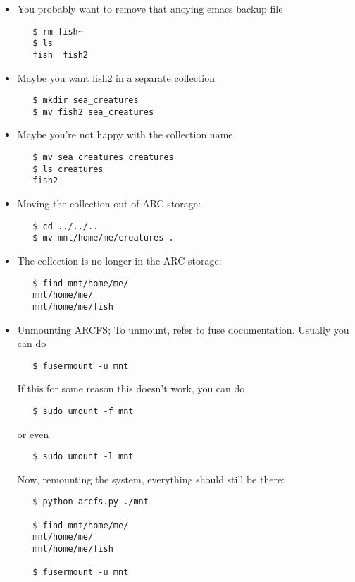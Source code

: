 \documentclass{book}
\begin{document}
\begin{itemize}
\item You probably want to remove that anoying emacs backup file
\begin{verbatim}   
   $ rm fish~
   $ ls 
   fish  fish2
\end{verbatim}

\item Maybe you want fish2 in a separate collection
\begin{verbatim}   
   $ mkdir sea_creatures
   $ mv fish2 sea_creatures
\end{verbatim}

\item Maybe you're not happy with the collection name
\begin{verbatim}
   $ mv sea_creatures creatures
   $ ls creatures
   fish2
\end{verbatim}

\item Moving the collection out of ARC storage:
\begin{verbatim}
   $ cd ../../..
   $ mv mnt/home/me/creatures .
\end{verbatim}

\item The collection is no longer in the ARC storage:
\begin{verbatim}
   $ find mnt/home/me/
   mnt/home/me/
   mnt/home/me/fish
\end{verbatim}

\item Unmounting ARCFS; To unmount, refer to fuse documentation. Usually you can do
\begin{verbatim}   
   $ fusermount -u mnt
\end{verbatim}

If this for some reason this doesn't work, you can do
\begin{verbatim}   
   $ sudo umount -f mnt
\end{verbatim}   

or even
\begin{verbatim}   
   $ sudo umount -l mnt
\end{verbatim}   

Now, remounting the system, everything should still be there:
\begin{verbatim}
   $ python arcfs.py ./mnt

   $ find mnt/home/me/
   mnt/home/me/
   mnt/home/me/fish

   $ fusermount -u mnt
\end{verbatim}
\end{itemize}
\end{document}
